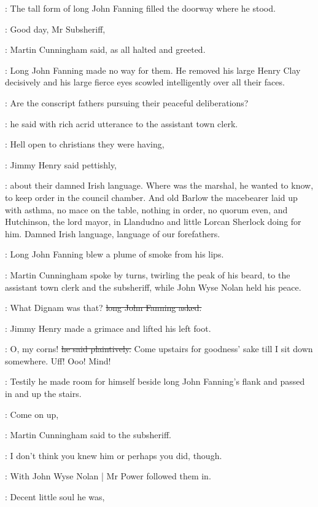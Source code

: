 :
The tall form of long John Fanning
filled the doorway where he stood.

\cunningham:
Good day, Mr Subsheriff,

:
Martin Cunningham said,
as all halted and greeted.%

:
Long John Fanning made no way for them.
He removed his large Henry Clay decisively
and his large fierce eyes scowled intelligently over all their faces.

\longjohn:
Are the conscript fathers pursuing their peaceful deliberations?

:
he said with rich acrid utterance
to the assistant town clerk.

\jimmyhenry:
Hell open to christians they were having,

:
Jimmy Henry said pettishly,

\jimmyhenry:
about their damned Irish language.
Where was the marshal,
he wanted to know,
to keep order in the council chamber.
And old Barlow the macebearer
laid up with asthma,
no mace on the table,
nothing in order,
no quorum even,
and Hutchinson, the lord mayor, in Llandudno
and little Lorcan Sherlock doing  for him.
Damned Irish language,
language of our forefathers.

:
Long John Fanning blew a plume of smoke from his lips.

:
Martin Cunningham spoke by turns,
twirling the peak of his beard,
to the assistant town clerk and the subsheriff,
while John Wyse Nolan held his peace.

\longjohn:
What Dignam was that?
\sout{long John Fanning asked.}

:
Jimmy Henry made a grimace and lifted his left foot.

\jimmyhenry:
O, my corns!
\sout{he said plaintively.}
Come upstairs for goodness' sake till I sit down somewhere.
Uff!
Ooo!
Mind!

:
Testily he made room for himself
beside long John Fanning's flank
and passed in and up the stairs.

\cunningham:
Come on up,

:
Martin Cunningham said to the subsheriff.

\cunningham:
I don't think you knew him
or perhaps you did, though.

:
With John Wyse Nolan |
Mr Power followed them in.

\power:
Decent little soul he was,

